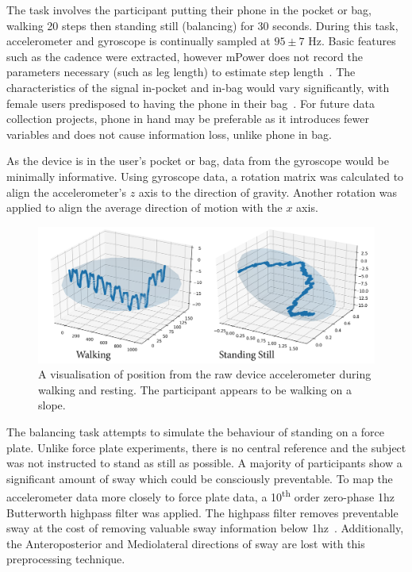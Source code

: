 \documentclass[12pt, twoside]{book}
\renewcommand\emph[1]{\textit{\color{USred}{#1}}}
\begin{document}

The \emph{walking} task involves the participant putting their phone in the pocket or bag, walking 20 steps then standing still (balancing) for 30 seconds. During this task, accelerometer and gyroscope is continually sampled at $95\pm7$ Hz. Basic features such as the cadence were extracted, however mPower does not record the parameters necessary (such as leg length) to estimate step length~\cite{diaz2014step}. The characteristics of the signal in-pocket and in-bag would vary significantly, with female users predisposed to having the phone in their bag~\cite{femalephone}. For future data collection projects, phone in hand may be preferable as it introduces fewer variables and does not cause information loss, unlike phone in bag.



As the device is in the user's pocket or bag, data from the gyroscope would be minimally informative. Using gyroscope data, a rotation matrix was calculated to align the accelerometer's $z$ axis to the direction of gravity. Another rotation was applied to align the average direction of motion with the $x$ axis.

\begin{figure}[h]
\label{mpowerwalking}
\centering\includegraphics[width=0.9\linewidth]{pathvis3d.png}
\caption{A visualisation of position from the raw device accelerometer during walking and resting. The participant appears to be walking on a slope.}
\end{figure}

The balancing task attempts to simulate the behaviour of standing on a force plate. Unlike force plate experiments, there is no central reference and the subject was not instructed to stand as still as possible. A majority of participants show a significant amount of sway which could be consciously preventable. To map the accelerometer data more closely to force plate data, a 10\textsuperscript{th} order zero-phase 1hz Butterworth highpass filter was applied. The highpass filter removes preventable sway at the cost of removing valuable sway information below 1hz~\cite{swayspectral}. Additionally, the Anteroposterior and Mediolateral directions of sway are lost with this preprocessing technique.
\end{document}
